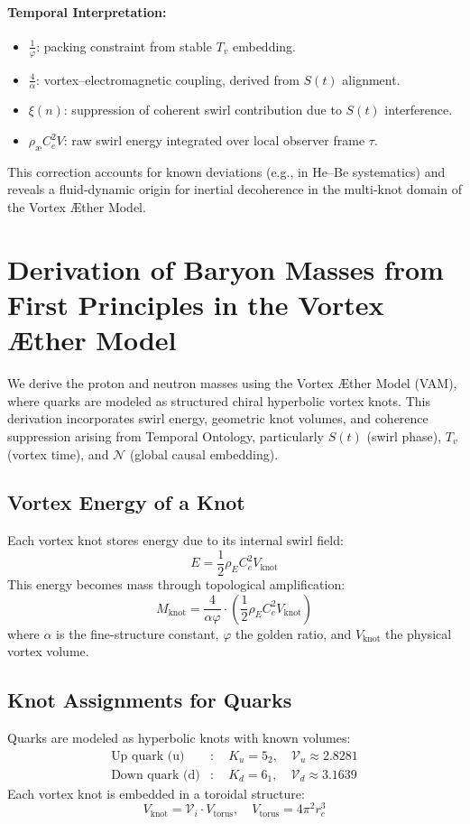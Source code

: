 \documentclass[12pt]{article}
\begin{document}
\paragraph{Temporal Interpretation:}
\begin{itemize}
  \item $\frac{1}{\varphi}$: packing constraint from stable $T_v$ embedding.
  \item $\frac{4}{\alpha}$: vortex–electromagnetic coupling, derived from $S(t)$ alignment.
  \item $\xi(n)$: suppression of coherent swirl contribution due to $S(t)$ interference.
  \item $\rho_\text{\ae} C_e^2 V$: raw swirl energy integrated over local observer frame $\tau$.
\end{itemize}

This correction accounts for known deviations (e.g., in He–Be systematics) and reveals a fluid-dynamic origin for inertial decoherence in the multi-knot domain of the Vortex \AE{}ther Model.


\section{Derivation of Baryon Masses from First Principles in the Vortex \AE{}ther Model}

We derive the proton and neutron masses using the Vortex \AE{}ther Model (VAM), where quarks are modeled as structured chiral hyperbolic vortex knots. This derivation incorporates swirl energy, geometric knot volumes, and coherence suppression arising from Temporal Ontology, particularly $S(t)$ (swirl phase), $T_v$ (vortex time), and $\mathcal{N}$ (global causal embedding).

\subsection{Vortex Energy of a Knot}
Each vortex knot stores energy due to its internal swirl field:
\[
E = \frac{1}{2} \rho_{\scriptscriptstyle\boldsymbol\!E}C_e^2 V_{\text{knot}}
\]
This energy becomes mass through topological amplification:
\[
\boxed{
M_{\text{knot}} = \frac{4}{\alpha \varphi} \cdot \left( \frac{1}{2} \rho_{\scriptscriptstyle\boldsymbol\!E}C_e^2 V_{\text{knot}} \right)
}
\]
where $\alpha$ is the fine-structure constant, $\varphi$ the golden ratio, and $V_{\text{knot}}$ the physical vortex volume.

\subsection{Knot Assignments for Quarks}
Quarks are modeled as hyperbolic knots with known volumes:
\[
\begin{aligned}
\text{Up quark (u)} &: \quad K_u = 5_2, \quad \mathcal{V}_u \approx 2.8281 \\
\text{Down quark (d)} &: \quad K_d = 6_1, \quad \mathcal{V}_d \approx 3.1639
\end{aligned}
\]
Each vortex knot is embedded in a toroidal structure:
\[
V_{\text{knot}} = \mathcal{V}_i \cdot V_{\text{torus}}, \quad V_{\text{torus}} = 4\pi^2 r_c^3
\]
\end{document}
